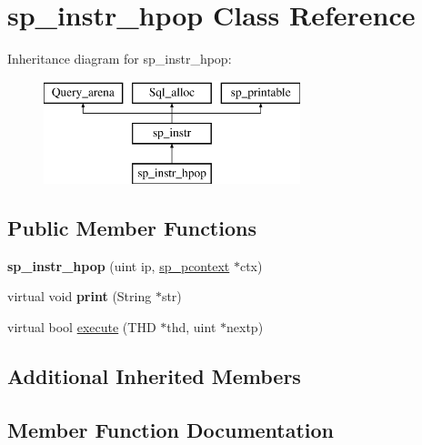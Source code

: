 \hypertarget{classsp__instr__hpop}{}\section{sp\+\_\+instr\+\_\+hpop Class Reference}
\label{classsp__instr__hpop}
Inheritance diagram for sp\+\_\+instr\+\_\+hpop\+:\begin{figure}[H]
\begin{center}
\leavevmode
\includegraphics[height=3.000000cm]{classsp__instr__hpop}
\end{center}
\end{figure}
\subsection*{Public Member Functions}
\begin{DoxyCompactItemize}
\item 
\mbox{\label{classsp__instr__hpop_aec6006def3b0e1da3f7263400f5afa9e}} 
{\bfseries sp\+\_\+instr\+\_\+hpop} (uint ip, \mbox{\hyperlink{classsp__pcontext}{sp\+\_\+pcontext}} $\ast$ctx)
\item 
\mbox{\label{classsp__instr__hpop_ac3359ba4cb51b73fea9b37f4c6bd04b6}} 
virtual void {\bfseries print} (String $\ast$str)
\item 
virtual bool \mbox{\hyperlink{classsp__instr__hpop_ab6a85bd2f0acc39580c6febfaa081767}{execute}} (T\+HD $\ast$thd, uint $\ast$nextp)
\end{DoxyCompactItemize}
\subsection*{Additional Inherited Members}


\subsection{Member Function Documentation}
\mbox{\label{classsp__instr__hpop_ab6a85bd2f0acc39580c6febfaa081767}} 
